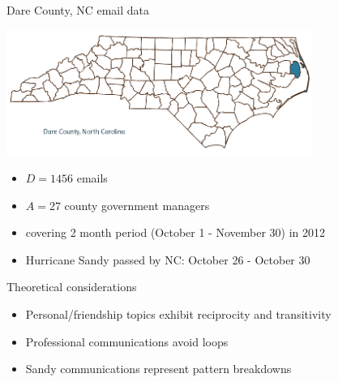 \documentclass[10pt, xcolor=table]{beamer}
\theoremstyle{definition}
\theoremstyle{remark}
\begin{document}
\begin{frame}{Dare County, NC email data}
\begin{center} \vspace{-1cm}
\includegraphics[width=0.75\textwidth]{figures/Dare.png}
\end{center}
 \begin{itemize}
 \item $D = 1456$ emails
\item  $A = 27$ county government managers
\item  covering 2 month period (October 1 - November 30) in 2012
\item Hurricane Sandy passed by NC: October 26 - October 30
 \end{itemize}
\end{frame}


\begin{frame}{Theoretical considerations}
\large
\begin{itemize}
\item Personal/friendship topics exhibit reciprocity and transitivity \vspace{.4cm}
\item Professional communications avoid loops  \vspace{.4cm}
\item Sandy communications represent pattern breakdowns
\end{itemize}

\end{frame}
\end{document}
